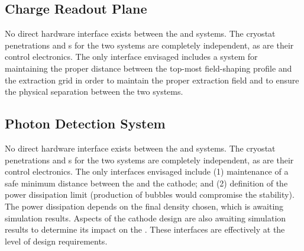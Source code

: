 \subsection{Charge Readout Plane}
\label{sec:fddp-hv-intfc-to-crp}

No direct hardware interface exists between the  and  systems. The cryostat penetrations and \fdth{}s for the two systems are completely independent, as are their control electronics. The only interface envisaged includes a system for maintaining the proper distance between the top-most field-shaping profile and the extraction grid in order to maintain the proper extraction field and to ensure the physical separation between the two systems. 

\subsection{Photon Detection System}
\label{sec:fddp-hv-intfc-to-pds}


No direct hardware interface exists between the  and  systems. The cryostat penetrations and \fdth{}s for the two systems are completely independent, as are their control electronics. The only interfaces envisaged include (1) maintenance of a safe minimum distance between the  and the \dptargetdriftvoltneg cathode; and (2)
 definition of the  power dissipation limit (production of bubbles would compromise the  stability). The power dissipation depends on the final  density chosen, which is awaiting simulation results. Aspects of the cathode design are also awaiting simulation results to determine its impact on the . 
These interfaces are effectively at the level of design requirements. 
%
%
%
%
%
%
%
%
%
%
